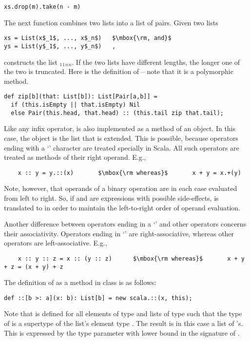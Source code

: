 \documentclass[a4paper,12pt,twoside,titlepage]{book}
\begin{document}
\begin{lstlisting}
xs.drop(m).take(n - m)
\end{lstlisting}

The next function combines two lists into a list of pairs.
Given two lists 
\begin{lstlisting}
xs = List(x$_1$, ..., x$_n$)   $\mbox{\rm, and}$
ys = List(y$_1$, ..., y$_n$)   ,
\end{lstlisting}
 constructs the list
$_1$$_1$$_n$$_n$\code{)}.
If the two lists have different lengths, the longer one of the two is
truncated. Here is the definition of  -- note that it is a
polymorphic method.
\begin{lstlisting}
def zip[b](that: List[b]): List[Pair[a,b]] = 
  if (this.isEmpty || that.isEmpty) Nil
  else Pair(this.head, that.head) :: (this.tail zip that.tail);
\end{lstlisting}

Like any infix operator, \code{::}
is also implemented as a method of an object. In this case, the object
is the list that is extended. This is possible, because operators
ending with a `\code{:}' character are treated specially in Scala.  
All such operators are treated as methods of their right operand. E.g.,
\begin{lstlisting}
    x :: y = y.::(x)       $\mbox{\rm whereas}$       x + y = x.+(y)                  
\end{lstlisting}
Note, however, that operands of a binary operation are in each case
evaluated from left to right.  So, if  and  are
expressions with possible side-effects,  is translated to
 in order to maintain the left-to-right
order of operand evaluation.

Another difference between operators ending in a `\code{:}' and other
operators concerns their associativity.  Operators ending in
`\code{:}' are right-associative, whereas other operators are
left-associative.  E.g.,
\begin{lstlisting}
    x :: y :: z = x :: (y :: z)      $\mbox{\rm whereas}$       x + y + z = (x + y) + z
\end{lstlisting}
The definition of \code{::} as a method in
class  is as follows:
\begin{lstlisting}
def ::[b >: a](x: b): List[b] = new scala.::(x, this);
\end{lstlisting}
Note that \code{::} is defined for all elements  of type
 and lists of type  such that the type 
of  is a supertype of the list's element type . The result
is in this case a list of 's. This
is expressed by the type parameter  with lower bound 
in the signature of \code{::}. 
\end{document}
